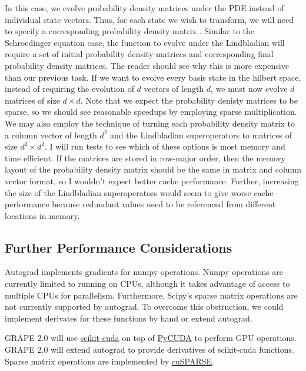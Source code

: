 \documentclass[letterpaper, 12pt]{article}
\begin{document}
In this case, we evolve probability density matrices under the PDE instead of individual state vectors. Thus, for each state we wish to transform, we will need to specify a corresponding probability density matrix \cite{basilewitsch2019reservoir}. Similar to the Schroedinger equation case, the function to evolve under the Lindbladian will require a set of initial probability density matrices and corresponding final probability density matrices. The reader should see why this is more expensive than our previous task. If we want to evolve every basis state in the hilbert space, instead of requiring the evolution of $d$ vectors of length $d$, we must now evolve $d$ matrices of size $d \times d$. Note that we expect the probability denisty matrices to be sparse, so we should see reasonable speedups by employing sparse multiplication. We may also employ the technique of turning each probability density matrix to a column vector of length $d^{2}$ and the Lindbladian superoperators to matrices of size $d^{2} \times d^{2}$. I will run tests to see which of these options is most memory and time efficient. If the matrices are stored in row-major order, then the memory layout of the probability density matrix should be the same in matrix and column vector format, so I wouldn't expect better cache performance. Further, increasing the size of the Lindbladian superoperators would seem to give worse cache performance because redundant values need to be referenced from different locations in memory.

\subsection{Further Performance Considerations}
Autograd implements gradients for numpy operations. Numpy operations are currently limited to running on CPUs, although it takes advantage of access to multiple CPUs for parallelism. Furthermore, Scipy's sparse matrix operations are not currently supported by autograd. To overcome this obstruction, we could implement derivates for these functions by hand or extend autograd.

GRAPE 2.0 will use \href{https://scikit-cuda.readthedocs.io/en/latest/}{scikit-cuda} on top of \href{https://documen.tician.de/pycuda/}{PyCUDA} to perform GPU operations. GRAPE 2.0 will extend autograd to provide derivatives of scikit-cuda functions. Sparse matrix operations are implemented by \href{https://pyculib.readthedocs.io/en/latest/cusparse.html}{cuSPARSE}.
\end{document}
